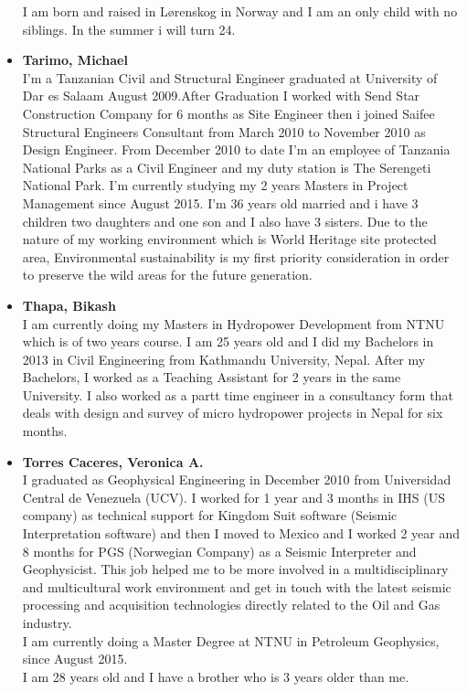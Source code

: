 \begin{itemize}
    I am born and raised in Lørenskog in Norway and I am an only child with no siblings. In the summer i will turn 24.
    \item \textbf{Tarimo, Michael}\\
    I'm a Tanzanian Civil and Structural Engineer graduated at University of Dar es Salaam August 2009.After Graduation I worked with Send Star Construction Company for 6 months as Site Engineer then i joined Saifee Structural Engineers Consultant from March 2010 to November 2010 as Design Engineer. From December 2010 to date I'm an employee of Tanzania National Parks as a Civil Engineer and my duty station is The Serengeti National Park.
    I'm currently studying my 2 years Masters in Project Management since August 2015.
    I'm 36 years old married and i have 3 children two daughters and one son and I also have 3 sisters.
    Due to the nature of my working environment which is World Heritage site protected area, Environmental sustainability is my first priority consideration in order to preserve the wild areas for the future generation.
    
    \item \textbf{Thapa, Bikash}\\
    I am currently doing my Masters in Hydropower Development from NTNU which is of two years course. I am 25 years old and I did my Bachelors in 2013 in Civil Engineering from Kathmandu University, Nepal. After my Bachelors, I worked as a Teaching Assistant for 2 years in the same University. I also worked as a partt time engineer in a consultancy form that deals with design and survey of micro hydropower projects in Nepal for six months. 
    \item \textbf{Torres Caceres, Veronica A.}\\
    I graduated as Geophysical Engineering in December 2010 from Universidad Central de Venezuela (UCV). I worked for 1 year and 3 months in IHS (US company) as technical support for Kingdom Suit software (Seismic Interpretation software) and then I moved to Mexico and I worked 2 year and 8 months for PGS (Norwegian Company) as a Seismic Interpreter and Geophysicist. This job helped me to be more involved in a multidisciplinary and multicultural work environment and get in touch with the latest seismic processing and acquisition technologies directly related to the Oil and Gas industry.\\
    I am currently doing a Master Degree at NTNU in Petroleum Geophysics, since August 2015. \\
    I am 28 years old and I have a brother who is 3 years older than me. 
    
\end{itemize}

